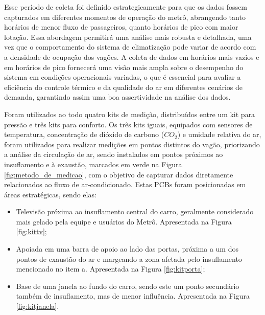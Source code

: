 \documentclass[acronym,symbols,table]{fei}
\begin{document}
Esse período de coleta foi definido estrategicamente para que os dados fossem capturados em diferentes momentos de operação do metrô, abrangendo tanto horários de menor fluxo de passageiros, quanto horários de pico com maior lotação. Essa abordagem permitirá uma análise mais robusta e detalhada, uma vez que o comportamento do sistema de climatização pode variar de acordo com a densidade de ocupação dos vagões. A coleta de dados em horários mais vazios e em horários de pico fornecerá uma visão mais ampla sobre o desempenho do sistema em condições operacionais variadas, o que é essencial para avaliar a eficiência do controle térmico e da qualidade do ar em diferentes cenários de demanda, garantindo assim uma boa assertividade na análise dos dados.

Foram utilizados ao todo quatro kits de medição, distribuídos entre um kit para pressão e três kits para conforto. Os três kits iguais, equipados com sensores de temperatura, concentração de dióxido de carbono (${CO}_{2}$) e umidade relativa do ar, foram utilizados para realizar medições em pontos distintos do vagão, priorizando a análise da circulação de ar, sendo instalados em pontos próximos ao insuflamento e à exaustão, marcados em verde na Figura \ref{fig:metodo_de_medicao}, com o objetivo de capturar dados diretamente relacionados ao fluxo de ar-condicionado. Estas PCBs foram posicionadas em áreas estratégicas, sendo elas:

\begin{itemize}[label=\arabic*.]
    \item Televisão próxima ao insuflamento central do carro, geralmente considerado mais gelado pela equipe e usuários do Metrô. Apresentada na Figura \ref{fig:kittv};
    \item Apoiada em uma barra de apoio ao lado das portas, próxima a um dos pontos de exaustão do ar e margeando a zona afetada pelo insuflamento mencionado no item a. Apresentada na Figura \ref{fig:kitporta};
    \item Base de uma janela ao fundo do carro, sendo este um ponto secundário também de insuflamento, mas de menor influência. Apresentada na Figura \ref{fig:kitjanela}.
\end{itemize}
\end{document}
